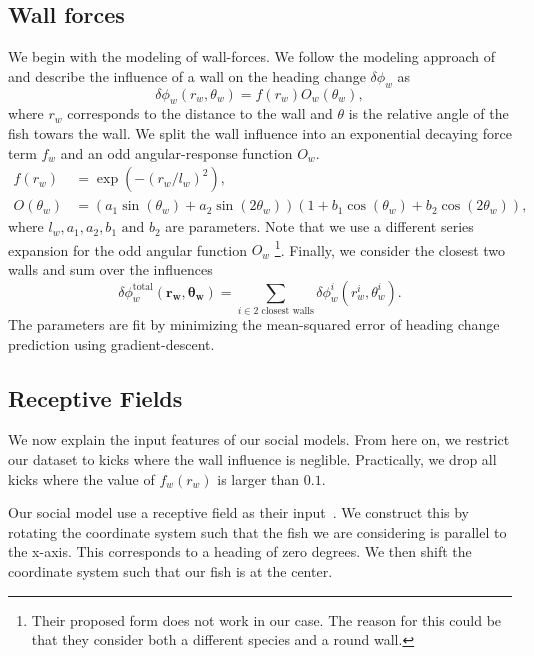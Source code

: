 \documentclass[nobib]{tufte-handout}
\begin{document}
\subsection{Wall forces}
We begin with the modeling of wall-forces.
We follow the modeling approach of~\autocite{calovi} and describe the influence of a wall on the heading change \(\delta \phi_w\) as
\begin{equation*}
  \delta \phi_w (r_w, \theta_w) = f(r_w)O_w(\theta_w),
\end{equation*}
where $r_w$ corresponds to the distance to the wall and $\theta$ is the relative angle of the fish towars the wall.
We split the wall influence into an exponential decaying force term \(f_w\) and an odd angular-response function \(O_w\).
\begin{align*}
  f(r_w) &= \exp\left( -{(r_w/l_w)}^2 \right), \\
  O(\theta_w) &= \left(a_1 \sin(\theta_w) + a_2 \sin(2  \theta_w)  \right)  \left(1 +  b_1  \cos(\theta_w) + b_2 \cos(2  \theta_w) \right),
\end{align*}
where $l_w, a_1, a_2, b_1 \text{ and } b_2$ are parameters.
Note that we use a different series expansion for the odd angular function \(O_w\)
\footnote{Their proposed form does not work in our case.
  The reason for this could be that they consider both a different species and a round wall.}.
Finally, we consider the closest two walls and sum over the influences
\begin{equation*}
 \delta \phi_w^{\text{total}} \left( \bm{r_w}, \bm{\theta_w} \right) = \sum_{i \in 2 \text{ closest walls}} \delta \phi_w^i (r_w^i, \theta_w^i).
\end{equation*}
The parameters are fit by minimizing the mean-squared error of heading change prediction using gradient-descent.

\subsection{Receptive Fields}
We now explain the input features of our social models.
From here on, we restrict our dataset to kicks where the wall influence is neglible.
Practically, we drop all kicks where the value of \(f_w(r_w)\) is larger than $0.1$.

Our social model use a receptive field as their input~\autocite{discreteModes}.
We construct this by rotating the coordinate system such that the fish we are considering is parallel to the x-axis.
This corresponds to a heading of zero degrees.
We then shift the coordinate system such that our fish is at the center.
\end{document}
